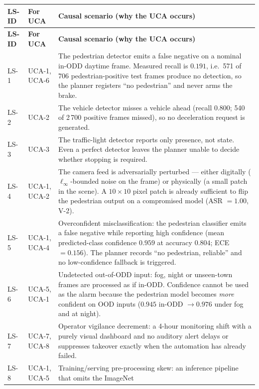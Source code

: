 \documentclass[a4paper,12pt]{article}
\begin{document}
{\footnotesize
\begin{longtable}{@{}P{1.0cm}P{1.7cm}P{12.3cm}@{}}
\toprule
\textbf{LS-ID} & \textbf{For UCA} & \textbf{Causal scenario (why the UCA occurs)} \\
\midrule
\endfirsthead
\toprule
\textbf{LS-ID} & \textbf{For UCA} & \textbf{Causal scenario (why the UCA occurs)} \\
\midrule
\endhead
\bottomrule
\endlastfoot
LS-1 & UCA-1, UCA-6
     & The pedestrian detector emits a false negative on a nominal in-ODD daytime frame.
       Measured recall is $0.191$, i.e.\ 571 of 706 pedestrian-positive test frames
       produce no detection, so the planner registers ``no pedestrian'' and never
       arms the brake. \\
LS-2 & UCA-2
     & The vehicle detector misses a vehicle ahead (recall $0.800$; 540 of 2\,700 positive
       frames missed), so no deceleration request is generated. \\
LS-3 & UCA-3
     & The traffic-light detector reports only presence, not state. Even a perfect
       detector leaves the planner unable to decide whether stopping is required. \\
LS-4 & UCA-1, UCA-2
     & The camera feed is adversarially perturbed --- either digitally
       ($\ell_\infty$-bounded noise on the frame) or physically (a small patch in the
       scene). A $10\times10$ pixel patch is already sufficient to flip the pedestrian
       output on a compromised model (ASR $=1.00$, V-2). \\
LS-5 & UCA-1, UCA-4
     & Overconfident misclassification: the pedestrian classifier emits a false negative
       while reporting high confidence (mean predicted-class confidence $0.959$ at
       accuracy $0.804$; ECE $=0.156$). The planner records ``no pedestrian, reliable'' and
       no low-confidence fallback is triggered. \\
LS-6 & UCA-5, UCA-1
     & Undetected out-of-ODD input: fog, night or unseen-town frames are processed as if
       in-ODD. Confidence cannot be used as the alarm because the pedestrian model becomes
       \emph{more} confident on OOD inputs ($0.945$ in-ODD $\rightarrow 0.976$ under fog
       and at night). \\
LS-7 & UCA-7, UCA-8
     & Operator vigilance decrement: a 4-hour monitoring shift with a purely visual
       dashboard and no auditory alert delays or suppresses takeover exactly when the
       automation has already failed. \\
LS-8 & UCA-1, UCA-5
     & Training/serving pre-processing skew: an inference pipeline that omits the ImageNet

\end{longtable}}
\end{document}
